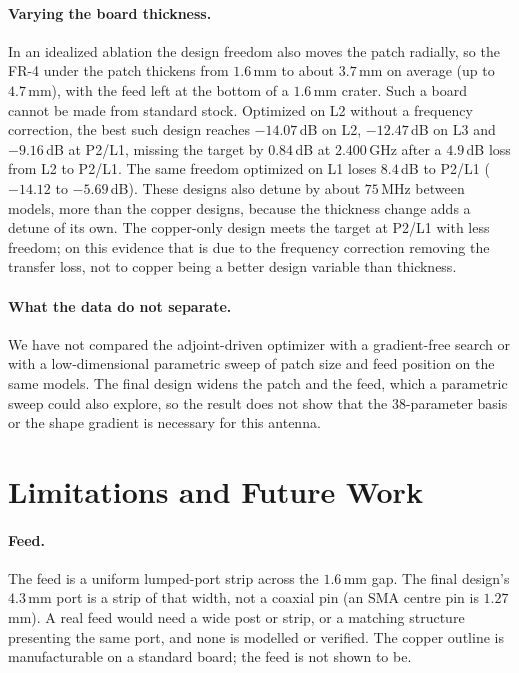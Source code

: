 \documentclass{anvil-paper}
\newcommand{\PL}{P2/L1}
\begin{document}
\paragraph{Varying the board thickness.}
In an idealized ablation the design freedom also moves the patch radially,
so the FR-4 under the patch thickens from $1.6$\,mm to about $3.7$\,mm on
average (up to $4.7$\,mm), with the feed left at the bottom of a $1.6$\,mm
crater. Such a board cannot be made from standard stock. Optimized on L2
without a frequency correction, the best such design reaches $-14.07$\,dB
on L2, $-12.47$\,dB on L3 and $-9.16$\,dB at \PL, missing the target by
$0.84$\,dB at $2.400$\,GHz after a $4.9$\,dB loss from L2 to \PL. The same
freedom optimized on L1 loses $8.4$\,dB to \PL{} ($-14.12$ to $-5.69$\,dB).
These designs also detune by about $75$\,MHz between models, more than the
copper designs, because the thickness change adds a detune of its own.
The copper-only design meets the target at \PL{} with less freedom; on
this evidence that is due to the frequency correction removing the
transfer loss, not to copper being a better design variable than
thickness.

\paragraph{What the data do not separate.}
We have not compared the adjoint-driven optimizer with a gradient-free
search or with a low-dimensional parametric sweep of patch size and feed
position on the same models. The final design widens the patch and the
feed, which a parametric sweep could also explore, so the result does not
show that the $38$-parameter basis or the shape gradient is necessary for
this antenna.

\section{Limitations and Future Work}
\label{sec:limits}

\paragraph{Feed.}
The feed is a uniform lumped-port strip across the $1.6$\,mm gap. The
final design's $4.3$\,mm port is a strip of that width, not a coaxial pin
(an SMA centre pin is $1.27$\,mm). A real feed would need a wide post or
strip, or a matching structure presenting the same port, and none is
modelled or verified. The copper outline is manufacturable on a standard
board; the feed is not shown to be.
\end{document}
